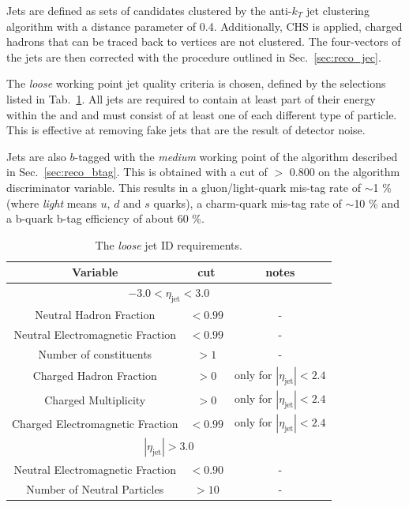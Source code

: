 Jets are defined as sets of \PF candidates clustered by
the anti-$k_{T}$ jet clustering algorithm with
a distance parameter of 0.4. Additionally, \ac{CHS} is applied, charged
hadrons that can be traced back to \PU vertices are not clustered. The
four-vectors of the jets are then corrected with the procedure
outlined in Sec.~\ref{sec:reco_jec}.

The \emph{loose} working point jet quality criteria is chosen, defined
by the selections listed in Tab.~\ref{tab:loose-jet-id}. All jets are
required to contain at least part of their energy within the \ECAL and
\HCAL and must consist of at least one of each different type of
particle. This is effective at removing fake jets that are the result
of detector noise.  

Jets are also $b$-tagged with the \emph{medium} working point of the
algorithm described in Sec.~\ref{sec:reco_btag}. This is obtained with
a cut of $>$ 0.800 on the algorithm discriminator variable. This
results in a gluon/light-quark mis-tag rate of $\sim$1 \% (where
\emph{light} means $u$, $d$ and $s$ quarks), a charm-quark mis-tag
rate of $\sim$10 \% and a b-quark b-tag efficiency of about 60 \%. 

\begin{table}[ht!]
  \caption{The \emph{loose} jet ID requirements. \label{tab:loose-jet-id}}
  \centering
  \begin{tabular}{ ccc }
    \hline
    \hline
    Variable & cut & notes \\ \hline
    \multicolumn{3}{c}{$-3.0 < \eta_{\mathrm{jet}} < 3.0$} \\ \hline    
    Neutral Hadron Fraction & $<0.99$ & - \\
    Neutral Electromagnetic Fraction & $<0.99$ & - \\
    Number of constituents & $>1$ & - \\
    Charged Hadron Fraction & $>0$ & only for $|\eta_{\mathrm{jet}}| < 2.4$ \\
    Charged Multiplicity & $>0$ & only for $|\eta_{\mathrm{jet}}| < 2.4$ \\
    Charged Electromagnetic Fraction & $<0.99$ & only for $|\eta_{\mathrm{jet}}| < 2.4$ \\ \hline
    \multicolumn{3}{c}{$|\eta_{\mathrm{jet}}| > 3.0$} \\ \hline        
    Neutral Electromagnetic Fraction & $<0.90$ & - \\
    Number of Neutral Particles & $>10$ & - \\
    \hline
    \hline
  \end{tabular}
\end{table}

